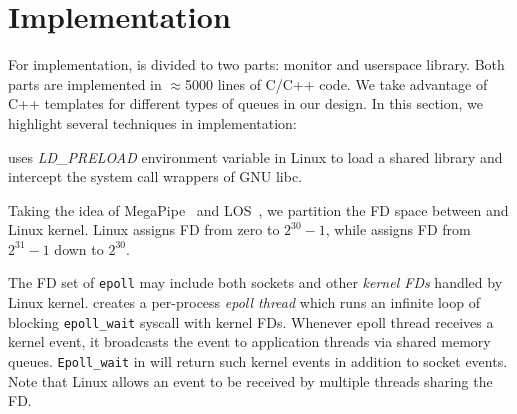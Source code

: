 \section{Implementation}
\label{sec:implementation}

For implementation, \libipc is divided to two parts: monitor and userspace library. Both parts are implemented in $\approx$5000 lines of C/C++ code. We take advantage of C++ templates for different types of queues in our design. %
In this section, we highlight several techniques in implementation:


\libipc uses \textit{LD\_PRELOAD} environment variable in Linux to load a shared library and intercept the system call wrappers of GNU libc.

Taking the idea of MegaPipe~\cite{han2012megapipe} and LOS~\cite{huang2017high}, we partition the FD space between \libipc and Linux kernel. Linux assigns FD from zero to $2^{30}-1$, while \libipc assigns FD from $2^{31}-1$ down to $2^{30}$.

The FD set of \texttt{epoll} may include both sockets and other \textit{kernel FDs} handled by Linux kernel.
\libipc{} creates a per-process \textit{epoll thread} which runs an infinite loop of blocking \texttt{epoll\_wait} syscall with kernel FDs. Whenever epoll thread receives a kernel event, it broadcasts the event to application threads via shared memory queues. \texttt{Epoll\_wait} in \libipc{} will return such kernel events in addition to socket events. Note that Linux allows an event to be received by multiple threads sharing the FD.


